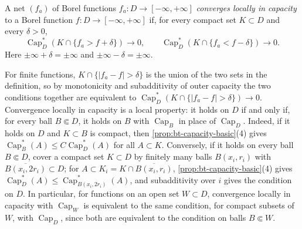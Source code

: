 \begin{definition}\label{def:local-capacity-convergence}
A net $(f_a)$ of Borel functions $f_a\colon D\to[-\infty,+\infty]$ \emph{converges locally in capacity} to a Borel function $f\colon D\to[-\infty,+\infty]$ if, for every compact set $K\subset D$ and every $\delta>0$,
\[
 \operatorname{Cap}_D^*(K\cap\{f_a>f+\delta\})\longrightarrow0,
 \qquad
 \operatorname{Cap}_D^*(K\cap\{f_a<f-\delta\})\longrightarrow0.
\]
Here $\pm\infty+\delta=\pm\infty$ and $\pm\infty-\delta=\pm\infty$.
\end{definition}
For finite functions, $K\cap\{|f_a-f|>\delta\}$ is the union of the two sets in the definition, so by monotonicity and subadditivity of outer capacity the two conditions together are equivalent to $\operatorname{Cap}_D^*(K\cap\{|f_a-f|>\delta\})\to0$. Convergence locally in capacity is a local property: it holds on $D$ if and only if, for every ball $B\Subset D$, it holds on $B$ with $\operatorname{Cap}_B$ in place of $\operatorname{Cap}_D$. Indeed, if it holds on $D$ and $K\subset B$ is compact, then \cref{prop:bt-capacity-basic}(4) gives $\operatorname{Cap}^*_B(A)\le C\operatorname{Cap}^*_D(A)$ for all $A\subset K$. Conversely, if it holds on every ball $B\Subset D$, cover a compact set $K\subset D$ by finitely many balls $B(x_i,r_i)$ with $\overline{B(x_i,2r_i)}\subset D$; for $A\subset K_i=K\cap\overline{B(x_i,r_i)}$, \cref{prop:bt-capacity-basic}(4) gives $\operatorname{Cap}^*_D(A)\le\operatorname{Cap}^*_{B(x_i,2r_i)}(A)$, and subadditivity over $i$ gives the condition on $D$. In particular, for functions on an open set $W\subset D$, convergence locally in capacity with $\operatorname{Cap}_W$ is equivalent to the same condition, for compact subsets of $W$, with $\operatorname{Cap}_D$, since both are equivalent to the condition on balls $B\Subset W$.

